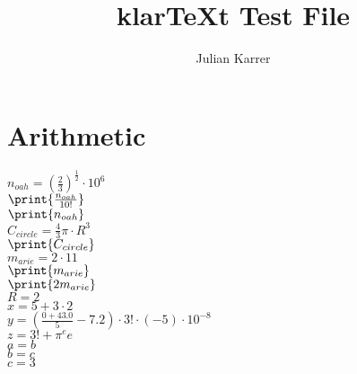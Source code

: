 \documentclass[oneside, a4paper]{article}
\author{Julian Karrer}
\title{klarTeXt Test File}
\begin{document}
\maketitle
\section*{Arithmetic}


\begin{program}


$n_{oah} = \left(\frac{2}{3}\right)^{\frac{1}{2}}\cdot 10^{6}$\\
$\print{\frac{n_{oah}}{10!}}$\\
$\print{n_{oah}}$\\
$C_{circle} = \frac{4}{3}\pi \cdot R^3$\\
$\print{C_{circle}}$\\
$m_{arie} = 2 \cdot 11$\\
$\print{m_{arie}}$\\
$\print{2m_{arie}}$\\
$R = 2$\\
$x = 5+3\cdot 2$\\
$y = \left(\frac{0+43.0}{5}-7.2\right)\cdot 3! \cdot (-5) \cdot 10^{-8}$\\
$z = 3! + \pi^e e$\\
$a = b$\\
$b = c$\\
$c = 3$\\

\end{program}
\end{document}
